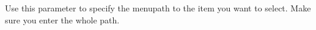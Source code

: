 
Use this parameter to specify the menupath to the item you want to select. Make sure you enter the whole path. 






